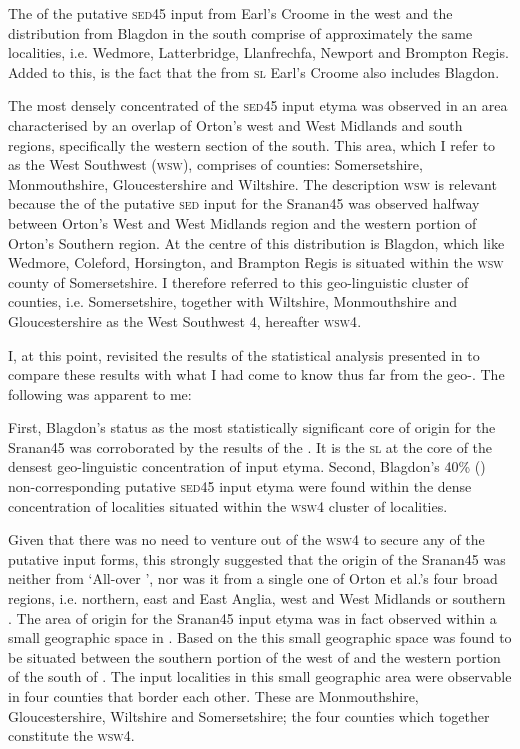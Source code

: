 The  of the putative \textsc{sed45} input from Earl's Croome in the west and the distribution from Blagdon in the south comprise of approximately the same localities, i.e. Wedmore, Latterbridge, Llanfrechfa, Newport and Brompton Regis. Added to this, is the fact that the  from \textsc{sl} Earl's Croome also includes Blagdon.

The most densely concentrated  of the \textsc{sed45} input etyma was observed in an area characterised by an overlap of Orton's west and West Midlands and south  regions, specifically the western section of the south. This area, which I refer to as the West Southwest (\textsc{wsw}), comprises of counties: Somersetshire, Monmouthshire, Gloucestershire and Wiltshire. The description \textsc{wsw} is relevant because the  of the putative \textsc{sed} input for the Sranan45 was observed halfway between Orton's West and West Midlands region and the western portion of Orton's Southern  region. At the centre of this distribution is Blagdon, which like Wedmore, Coleford, Horsington, and Brampton Regis is situated within the \textsc{wsw} county of Somersetshire. I therefore referred to this geo-linguistic cluster of counties, i.e. Somersetshire, together with Wiltshire, Monmouthshire and Gloucestershire as the West Southwest 4, hereafter \textsc{wsw4}.

I, at this point, revisited the results of the statistical analysis presented in  to compare these results with what I had come to know thus far from the geo-. The following was apparent to me:

First, Blagdon's status as the most statistically significant core  of origin for the Sranan45 was corroborated by the results of the . It is the \textsc{sl} at the core of the densest geo-linguistic concentration of input etyma. Second, Blagdon's 40\% () non-corresponding putative \textsc{sed45} input etyma were found within the dense concentration of localities situated within the \textsc{wsw4} cluster of localities.

Given that there was no need to venture out of the \textsc{wsw4} to secure any of the putative input forms, this strongly suggested that the origin of the Sranan45 was neither from `All-over ', nor was it from a single one of Orton et al.'s four broad regions, i.e. northern, east and East Anglia, west and West Midlands or southern  \citep{Orton6271}. The area of origin for the Sranan45 input etyma was in fact observed within a small geographic space in . Based on the  this small geographic space was found to be situated between the southern portion of the west of  and the western portion of the south of . The input localities in this small geographic area were observable in four counties that border each other. These are Monmouthshire, Gloucestershire, Wiltshire and Somersetshire; the four counties which together constitute the \textsc{wsw4}.

